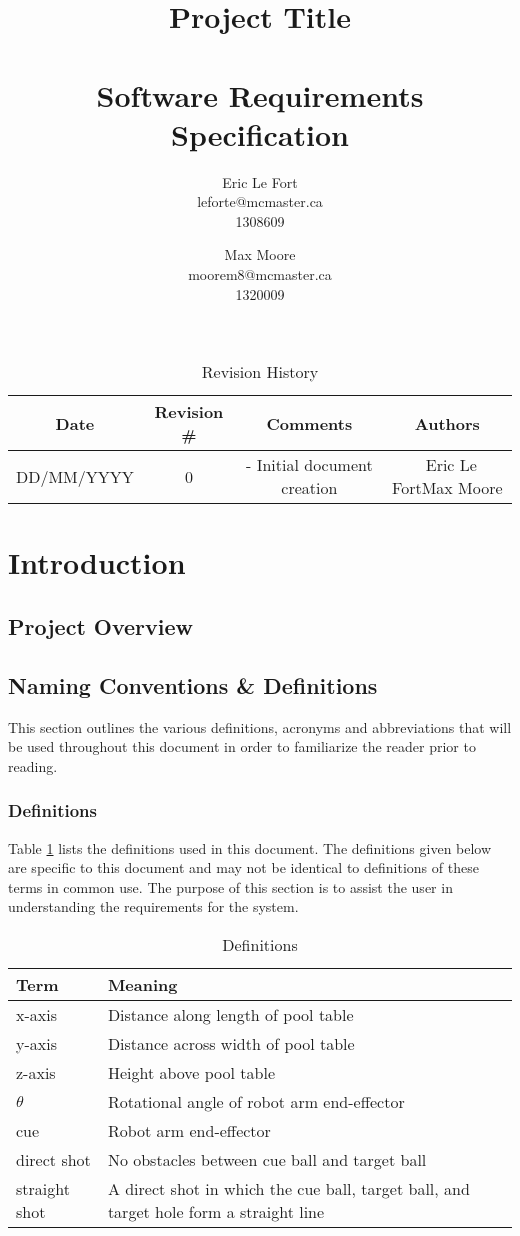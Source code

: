 \documentclass[titlepage]{article}
\title{Project Title\\~\\Software Requirements Specification}
\author{
Eric Le Fort\\leforte@mcmaster.ca\\1308609\and
Max Moore\\moorem8@mcmaster.ca\\1320009
}
\begin{document}
\maketitle


\tableofcontents
\listoffigures
\listoftables


\vfill
\begin{table}[!htbp]
\centering
\begin{tabular}{| C{3} | C{2} | C{5} | C{2.5} |}\hline
	Date			&Revision \#	&Comments						&Authors\\\hline
	DD/MM/YYYY		&0				&- Initial document creation	&~Eric Le Fort\newline Max Moore\\\hline
\end{tabular}
\caption{Revision History}
\end{table}
\newpage

\section{Introduction}
\subsection{Project Overview}
\subsection{Naming Conventions \& Definitions}
This section outlines the various definitions, acronyms and abbreviations that will be used throughout this document in order to familiarize the reader prior to reading.
\subsubsection{Definitions}
Table \ref{tab:Definitions} lists the definitions used in this document. The definitions given below are specific to this document and may not be identical to definitions of these terms in common use. The purpose of this section is to assist the user in understanding the requirements for the system.
\begin{table}[h!]
\centering
\caption{Definitions}
    \begin{tabular}{| p{6cm} | p{6cm} |}\hline
    \textbf{Term}	&\textbf{Meaning}\\\hline
	x-axis					&Distance along length of pool table\\\hline
	y-axis					&Distance across width of pool table\\\hline
	z-axis					&Height above pool table\\\hline
	$\theta$				&Rotational angle of robot arm end-effector\\\hline
	cue 					&Robot arm end-effector\\\hline
	direct shot				&No obstacles between cue ball and target ball\\\hline
	straight shot			&A direct shot in which the cue ball, target ball, and target hole form a straight line\\\hline
    \end{tabular}
\label{tab:Definitions}
\end{table}
\end{document}
